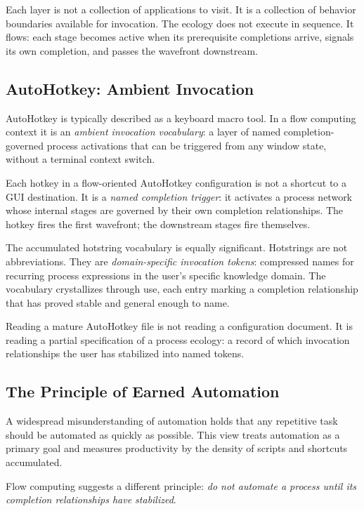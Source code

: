 \documentclass[12pt, a4paper]{article}
\begin{document}
Each layer is not a collection of applications to visit. It is a
collection of behavior boundaries available for invocation. The ecology
does not execute in sequence. It flows: each stage becomes active when
its prerequisite completions arrive, signals its own completion, and
passes the wavefront downstream.

\subsection{AutoHotkey: Ambient Invocation}

AutoHotkey is typically described as a keyboard macro tool. In a flow
computing context it is an \emph{ambient invocation vocabulary}: a
layer of named completion-governed process activations that can be
triggered from any window state, without a terminal context switch.

Each hotkey in a flow-oriented AutoHotkey configuration is not a
shortcut to a GUI destination. It is a \emph{named completion trigger}:
it activates a process network whose internal stages are governed by
their own completion relationships. The hotkey fires the first
wavefront; the downstream stages fire themselves.

The accumulated hotstring vocabulary is equally significant. Hotstrings
are not abbreviations. They are \emph{domain-specific invocation tokens}:
compressed names for recurring process expressions in the user's
specific knowledge domain. The vocabulary crystallizes through use,
each entry marking a completion relationship that has proved stable
and general enough to name.

Reading a mature AutoHotkey file is not reading a configuration
document. It is reading a partial specification of a process ecology:
a record of which invocation relationships the user has stabilized
into named tokens.

\subsection{The Principle of Earned Automation}

A widespread misunderstanding of automation holds that any repetitive
task should be automated as quickly as possible. This view treats
automation as a primary goal and measures productivity by the density
of scripts and shortcuts accumulated.

Flow computing suggests a different principle: \emph{do not automate
a process until its completion relationships have stabilized}.
\end{document}
